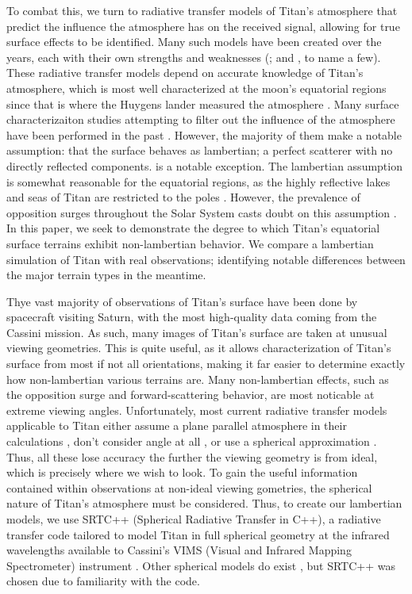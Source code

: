 \documentclass[twocolumn,linenumbers]{aastex631}
\begin{document}
To combat this, we turn to radiative transfer models of Titan's atmosphere that predict the influence the atmosphere has on the received signal, allowing for true surface effects to be identified. Many such models have been created over the years, each with their own strengths and weaknesses (\cite{Griffith2012, Xu2013, Barnes2018, Corlies2021, Rannou2021}; and \cite{EsSayeh2023}, to name a few). These radiative transfer models depend on accurate knowledge of Titan's atmosphere, which is most well characterized at the moon's equatorial regions since that is where the Huygens lander measured the atmosphere \citep{Tomasko2008}. Many surface characterizaiton studies attempting to filter out the influence of the atmosphere have been performed in the past \citep{Buratti2006, Soderblom2009, Kazeminejad2011, Brossier2018, EsSayeh2023, Solomonidou2024}. However, the majority of them make a notable assumption: that the surface behaves as lambertian; a perfect scatterer with no directly reflected components. \cite{Buratti2006} is a notable exception. The lambertian assumption is somewhat reasonable for the equatorial regions, as the highly reflective lakes and seas of Titan are restricted to the poles \citep{Hayes2016}. However, the prevalence of opposition surges throughout the Solar System casts doubt on this assumption \citep{Deau2009}. In this paper, we seek to demonstrate the degree to which Titan's equatorial surface terrains exhibit non-lambertian behavior. We compare a lambertian simulation of Titan with real observations; identifying notable differences between the major terrain types in the meantime.

Thye vast majority of observations of Titan's surface have been done by spacecraft visiting Saturn, with the most high-quality data coming from the Cassini mission. As such, many images of Titan's surface are taken at unusual viewing geometries. This is quite useful, as it allows characterization of Titan's surface from most if not all orientations, making it far easier to determine exactly how non-lambertian various terrains are. Many non-lambertian effects, such as the opposition surge \citep{Deau2009} and forward-scattering behavior, are most noticable at extreme viewing angles. Unfortunately, most current radiative transfer models applicable to Titan either assume a plane parallel atmosphere in their calculations \citep{Griffith2012, EsSayeh2023}, don't consider angle at all \citep{Rannou2021}, or use a spherical approximation \citep{Corlies2021}. Thus, all these lose accuracy the further the viewing geometry is from ideal, which is precisely where we wish to look. To gain the useful information contained within observations at non-ideal viewing gometries, the spherical nature of Titan's atmosphere must be considered. Thus, to create our lambertian models, we use SRTC++ (Spherical Radiative Transfer in C++), a radiative transfer code tailored to model Titan in full spherical geometry at the infrared wavelengths available to Cassini's VIMS (Visual and Infrared Mapping Spectrometer) instrument \citep{Barnes2018}. Other spherical models do exist \citep{Xu2013}, but SRTC++ was chosen due to familiarity with the code.
\end{document}
